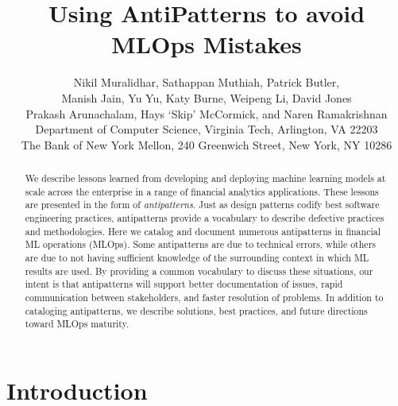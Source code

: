 \documentclass[sigconf,authorversion,nonacm]{acmart}
\begin{document}
\title{Using AntiPatterns to avoid MLOps Mistakes}

\author{Nikil Muralidhar\footnotemark[2], Sathappan Muthiah\footnotemark[2], Patrick Butler\footnotemark[2], \\ Manish Jain\footnotemark[4], Yu Yu\footnotemark[4], Katy Burne\footnotemark[4], Weipeng Li\footnotemark[4], David Jones\footnotemark[4]\\Prakash Arunachalam\footnotemark[4], Hays `Skip' McCormick\footnotemark[4], and Naren Ramakrishnan\footnotemark[2]\\
\footnotemark[2]Department of Computer Science, Virginia Tech, Arlington, VA 22203\\
\footnotemark[4]The Bank of New York Mellon, 240 Greenwich Street, New York, NY 10286}

\renewcommand{\shortauthors}{Muralidhar and Muthiah et al.}
\renewcommand{\shorttitle}{MLOps with Financial Applications}
\newcommand{\nikhilc}[1]{\textcolor{red}{#1}}


\begin{abstract}
We describe lessons learned from developing and deploying machine learning models at scale across the enterprise in a range of
financial analytics applications. These lessons are presented in the form of {\it antipatterns}.
Just as design patterns codify best software engineering practices, antipatterns provide a vocabulary to describe defective practices and methodologies. Here we catalog and document numerous antipatterns in financial ML  operations (MLOps).
Some antipatterns are due to technical errors, while others are due to not having sufficient knowledge of the surrounding context in which ML results are used. By providing a common vocabulary to discuss these situations, our intent is that antipatterns will support better documentation of issues, rapid communication between stakeholders, and faster resolution of problems. In addition
to cataloging antipatterns, we describe solutions, best practices, and future directions toward MLOps maturity.
\end{abstract}

\maketitle

\section{Introduction}

\end{document}
